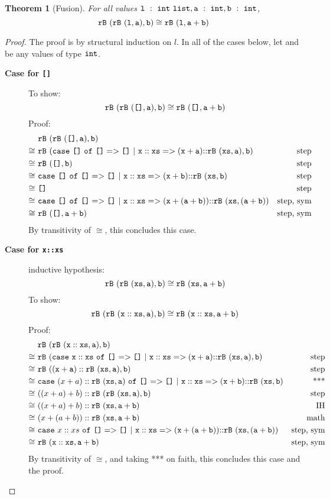 \documentclass[11pt]{article}
\newtheorem{theorem}{Theorem}
\newcommand{\ttt}[1]{\texttt{#1}}
\begin{document}
\begin{theorem}[Fusion]
\label{thrm:fusion}
For all values $\oftpm{l}{\tlst{\tint}}, \oftpm{a}{\tint},
\oftpm{b}{\tint}$, $$\pred{l}$$
\end{theorem}
\begin{proof}
The proof is by structural induction on $l$. In all of the cases below, let
 and  be any values of type $\tint$.

\begin{description}
\item [\textbf{Case for \ttt{[]}}]
  To show: $$\pred{\vnil}$$
  Proof:
  \begin{align*}
    &\LHS{\vnil} &\\
    \cong~& \mappm{\rb}{(\rbbod{\vnil}{a},b)} &\text{step}\\
    \cong~& \mappm{\rb}{(\vnil,b)}            &\text{step}\\
    \cong~& \rbbod{\vnil}{b}                  &\text{step}\\
    \cong~& \vnil                             &\text{step}\\
    \cong~& \rbbod{\vnil}{(a+b)}              &\text{step, sym}\\
    \cong~& \RHS{\vnil}                       &\text{step, sym}
  \end{align*}
  By transitivity of $\cong$, this concludes this case.

\item [\textbf{Case for \ttt{x::xs}}]
  inductive hypothesis: $$\pred{xs}$$
  To show: $$\pred{x::xs}$$
  Proof:
  \begin{align*}
    &\LHS{x::xs} &\\
    \cong~& \mappm{\rb}{(\rbbod{x::xs}{a},b)}               &\text{step}\\
    \cong~& \mappm{\rb}{((x+a)::\mappm{\rb}{(xs,a)},b)}     &\text{step}\\
    \cong~& \rbbod{(x+a)::\mappm{\rb}{(xs,a)}}{b}           &\text{***}\\
    \cong~& ((x+a)+b)::\mappm{\rb}{(\mappm{\rb}{(xs,a)},b)} &\text{step}\\
    \cong~& ((x+a)+b)::\RHS{xs}                             &\text{IH}\\
    \cong~& (x+(a+b))::\RHS{xs}                             &\text{math}\\
    \cong~& \rbbod{x::xs}{(a+b)}                            &\text{step, sym}\\
    \cong~& \RHS{x::xs}                                     &\text{step, sym}
  \end{align*}
  By transitivity of $\cong$, and taking *** on faith, this concludes this
  case and the proof.
\end{description}
\end{proof}
\end{document}
